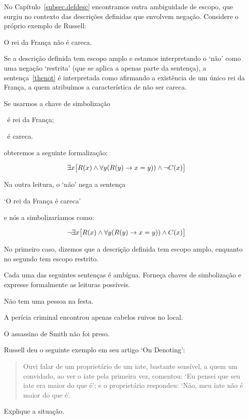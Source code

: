 No Capítulo~\ref{subsec.defdesc} encontramos outra ambiguidade de escopo, que surgiu no contexto das descrições definidas que envolvem negação. Considere o próprio exemplo de Russell:

\begin{earg}
    \item [\ex{thenot}] O rei da França não é careca.
\end{earg}

Se a descrição definida tem escopo amplo e estamos interpretando o `não' como uma negação `restrita' (que se aplica a apenas parte da sentença), a sentença~\ref{thenot} é interpretada como afirmando a existência de um único rei da França, a quem atribuímos a característica de não ser careca.

Se usarmos a chave de simbolização

\begin{ekey}
    \item [\atom{R}{x}] ~é rei da França;
    \item [\atom{C}{x}] ~é careca.
\end{ekey}

obteremos a seguinte formalização:

$$\exists x\bigl[\mathord{R}(x) \wedge \forall y (\mathord{R}(y) \rightarrow x = y)) \wedge \neg \mathord{C}(x)\bigr]$$

Na outra leitura, o `não' nega a sentença

\begin{center}
`O rei da França é careca'
\end{center}

e nós a simbolizaríamos como:

$$\neg \exists x\bigl[\mathord{R}(x) \wedge \forall y (\mathord{R}(y) \rightarrow x = y)) \wedge \mathord{C}(x)\bigr]$$

No primeiro caso, dizemos que a descrição definida tem escopo amplo, enquanto no segundo tem escopo restrito.

\practiceproblems
\problempart

Cada uma das seguintes sentenças é ambígua. Forneça chaves de simbolização e expresse formalmente as leituras possíveis.

\begin{earg}
    \item Não tem uma pessoa na festa.
    \item A perícia criminal encontrou apenas cabelos ruivos no local.
    \item O assassino de Smith não foi preso.
\end{earg}

\problempart
Russell deu o seguinte exemplo em seu artigo `On Denoting':

\begin{quote}
    Ouvi falar de um proprietário de um iate, bastante sensível, a quem um convidado, ao ver o iate pela primeira vez, comentou: `Eu pensei que seu iate era maior do que é'; e o proprietário respondeu: `Não, meu iate não é maior do que é'.
\end{quote}

Explique a situação.